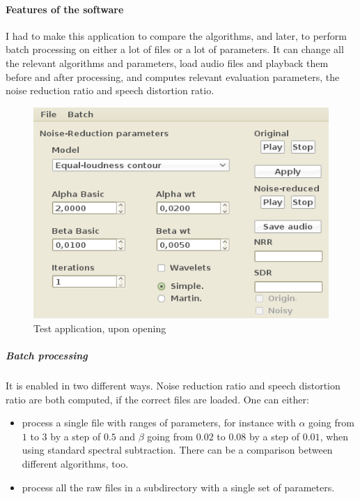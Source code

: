 \paragraph{Features of the software}
I had to make this application to compare the algorithms, and later, to perform batch processing on either a lot of files or a lot of parameters.
It can change all the relevant algorithms and parameters, load audio files and playback them before and after processing, and computes relevant evaluation parameters, the noise reduction ratio and speech distortion ratio\cite{horii2013musical}.
\begin{figure}[h]
\begin{center}
\includegraphics[scale=0.75]{testapp1.png}
\caption{Test application, upon opening}
\label{diag_api_chords}
\end{center}
\end{figure}

\subparagraph{Batch processing} It is enabled in two different ways. 
Noise reduction ratio and speech distortion ratio are both computed, if the correct files are loaded.
One can either:
\begin{itemize}
\item process a single file with ranges of parameters, for instance with $\alpha$ going from $1$ to $3$ by a step of $0.5$ and  $\beta$ going from $0.02$ to $0.08$ by a step of $0.01$, when using standard spectral subtraction. There can be a comparison between different algorithms, too.
\item process all the raw files in a subdirectory with a single set of parameters.
\end{itemize}

